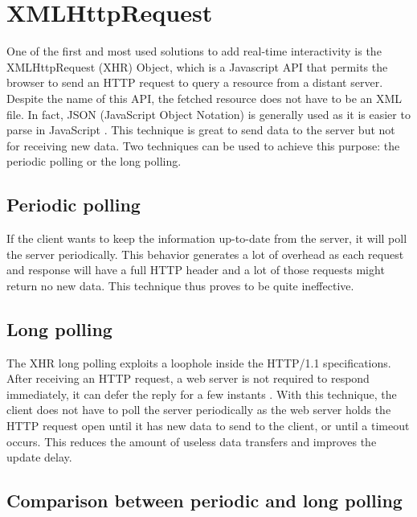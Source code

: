 \documentclass[10pt,journal,compsoc]{IEEEtran}
\begin{document}
\section{XMLHttpRequest}
\label{XHR}
One of the first and most used solutions to add real-time interactivity is the XMLHttpRequest (XHR) Object, which is a Javascript API that permits the browser to send an HTTP request to query a resource from a distant server. %
Despite the name of this API, the fetched resource does not have to be an XML file. %
In fact, JSON (JavaScript Object Notation) is generally used as it is easier to parse in JavaScript \cite{collinalatency}.
This technique is great to send data to the server but not for receiving new data.
Two techniques can be used to achieve this purpose: the periodic polling or the long polling.

\subsection{Periodic polling}
If the client wants to keep the information up-to-date from the server, it will poll the server periodically.
This behavior generates a lot of overhead as each request and response will have a full HTTP header and a lot of those requests might return no new data. This technique thus proves to be quite ineffective. %

\subsection{Long polling}

The XHR long polling exploits a loophole inside the \mbox{HTTP/1.1} specifications.
After receiving an HTTP request, a web server is not required to respond immediately, it can defer the reply for a few instants \cite{collinalatency}.
With this technique, the client does not have to poll the server periodically as the web server holds the HTTP request open until it has new data to send to the client, or until a timeout occurs.
This reduces the amount of useless data transfers and improves the update delay.

\subsection{Comparison between periodic and long polling}
\end{document}
